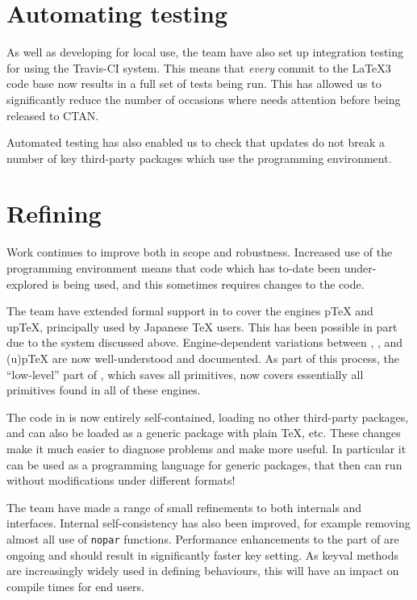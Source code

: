 \documentclass{ltnews}
\begin{document}
\section{Automating  testing}

As well as developing  for local use, the team have also set up
integration testing for  using the Travis-CI system. This means that
\emph{every} commit to the \LaTeX3 code base now results in a full set of tests
being run. This has allowed us to significantly reduce the number of occasions
where  needs attention before being released to CTAN.

Automated testing has also enabled us to check that  updates do not
break a number of key third-party packages which use the programming
environment.

\section{Refining }

Work continues to improve  both in scope and robustness. Increased
use of the programming environment means that code which has to-date been
under-explored is being used, and this sometimes requires changes to the code.

The team have extended formal support in  to cover the engines
p\TeX{} and up\TeX{}, principally used by Japanese \TeX{} users. This has been
possible in part due to the  system discussed above.
Engine-dependent variations between , ,
 and (u)p\TeX{} are now well-understood and documented. As part
of this process, the \enquote{low-level} part of , which saves all
primitives, now covers essentially all primitives found in all of these
engines.

The code in  is now entirely self-contained, loading no other
third-party packages, and can also be loaded as a generic package with plain
\TeX{}, etc. These changes make it much easier to diagnose problems and
make  more useful. In particular it can be used as a programming
language for generic packages, that then can run without modifications under
different formats!

The team have made a range of small refinements to both internals and
 interfaces. Internal self-consistency has also been improved, for
example removing almost all use of \texttt{nopar} functions. Performance
enhancements to the  part of  are ongoing and should
result in significantly faster key setting. As keyval methods are increasingly
widely used in defining behaviours, this will have an impact on compile times
for end users.
\end{document}
